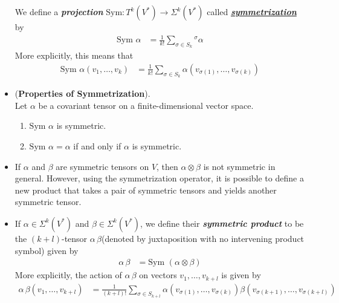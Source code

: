 \documentclass[11pt]{article}
\begin{document}
\begin{itemize}
\begin{definition}
We define a \emph{\textbf{projection}} $\text{Sym}: T^k(V^{*}) \rightarrow \Sigma^{k}(V^{*})$ called \underline{\emph{\textbf{symmetrization}}} by
\begin{align*}
\text{Sym }\alpha &= \frac{1}{k!}\sum_{\sigma \in S_{k}}{^{\sigma}\alpha}
\end{align*}
More explicitly, this means that
\begin{align*}
\text{Sym }\alpha(v_1, \ldots, v_k) &= \frac{1}{k!}\sum_{\sigma \in S_{k}} \alpha(v_{\sigma(1)}, \ldots, v_{\sigma(k)})
\end{align*}
\end{definition}

\item \begin{proposition} (\textbf{Properties of Symmetrization}).\\
 Let $\alpha$ be a covariant tensor on a finite-dimensional vector space.
 \begin{enumerate}
 \item $\text{Sym }\alpha $ is symmetric.
 \item $\text{Sym }\alpha = \alpha$ if and only if $\alpha$ is symmetric.
 \end{enumerate}
\end{proposition}

\item \begin{remark}
If $\alpha$ and $\beta$ are symmetric tensors on $V$, then $\alpha\otimes \beta$ is not symmetric in general. However, using the symmetrization operator, it is possible to define a new product that takes a pair of symmetric tensors and yields another symmetric tensor. 
\end{remark}

\item \begin{definition}
If $\alpha \in \Sigma^{k}(V^{*})$ and $\beta \in \Sigma^{k}(V^{*})$, we define their \emph{\textbf{symmetric product}} to be the $(k + l)$-tensor $\alpha\,\beta$(denoted by juxtaposition with no intervening product symbol) given by
\begin{align*}
\alpha\,\beta &= \text{Sym }(\alpha \otimes \beta)
\end{align*}
More explicitly, the action of $\alpha\,\beta$ on vectors $v_1,\ldots,v_{k+l}$ is given by
\begin{align*}
\alpha\,\beta(v_1,\ldots,v_{k+l}) &= \frac{1}{(k+l)!}\sum_{\sigma \in S_{k+l}}\alpha(v_{\sigma(1)},\ldots,v_{\sigma(k)})\beta(v_{\sigma(k+1)},\ldots,v_{\sigma(k+l)})
\end{align*}
\end{definition}


\end{itemize}
\end{document}
